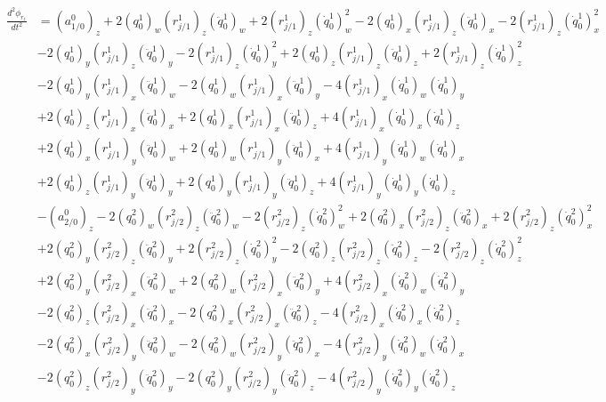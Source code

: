 \documentclass{article}
\begin{document}
\begin{align}
    \begin{split}
        \frac{d^2\phi_{r_z}}{dt^2} &= (a_{1/0}^0)_z + 2(q_0^1)_w(r_{j/1}^1)_z(\ddot{q}_0^1)_w + 2(r_{j/1}^1)_z(\dot{q}_0^1)_w^2 - 2(q_0^1)_x(r_{j/1}^1)_z(\ddot{q}_0^1)_x - 2(r_{j/1}^1)_z(\dot{q}_0^1)_x^2 \\
                                   &- 2(q_0^1)_y(r_{j/1}^1)_z(\ddot{q}_0^1)_y - 2(r_{j/1}^1)_z(\dot{q}_0^1)_y^2 + 2(q_0^1)_z(r_{j/1}^1)_z(\ddot{q}_0^1)_z + 2(r_{j/1}^1)_z(\dot{q}_0^1)_z^2 \\
                                   &- 2(q_0^1)_y(r_{j/1}^1)_x(\ddot{q}_0^1)_w - 2(q_0^1)_w(r_{j/1}^1)_x(\ddot{q}_0^1)_y - 4(r_{j/1}^1)_x(\dot{q}_0^1)_w(\dot{q}_0^1)_y \\
                                   &+ 2(q_0^1)_z(r_{j/1}^1)_x(\ddot{q}_0^1)_x + 2(q_0^1)_x(r_{j/1}^1)_x(\ddot{q}_0^1)_z + 4(r_{j/1}^1)_x(\dot{q}_0^1)_x(\dot{q}_0^1)_z \\
                                   &+ 2(q_0^1)_x(r_{j/1}^1)_y(\ddot{q}_0^1)_w + 2(q_0^1)_w(r_{j/1}^1)_y(\ddot{q}_0^1)_x + 4(r_{j/1}^1)_y(\dot{q}_0^1)_w(\dot{q}_0^1)_x \\
                                   &+ 2(q_0^1)_z(r_{j/1}^1)_y(\ddot{q}_0^1)_y + 2(q_0^1)_y(r_{j/1}^1)_y(\ddot{q}_0^1)_z + 4(r_{j/1}^1)_y(\dot{q}_0^1)_y(\dot{q}_0^1)_z \\
                                   &- (a_{2/0}^0)_z - 2(q_0^2)_w(r_{j/2}^2)_z(\ddot{q}_0^2)_w - 2(r_{j/2}^2)_z(\dot{q}_0^2)_w^2 + 2(q_0^2)_x(r_{j/2}^2)_z(\ddot{q}_0^2)_x + 2(r_{j/2}^2)_z(\dot{q}_0^2)_x^2 \\
                                   &+ 2(q_0^2)_y(r_{j/2}^2)_z(\ddot{q}_0^2)_y + 2(r_{j/2}^2)_z(\dot{q}_0^2)_y^2 - 2(q_0^2)_z(r_{j/2}^2)_z(\ddot{q}_0^2)_z - 2(r_{j/2}^2)_z(\dot{q}_0^2)_z^2 \\
                                   &+ 2(q_0^2)_y(r_{j/2}^2)_x(\ddot{q}_0^2)_w + 2(q_0^2)_w(r_{j/2}^2)_x(\ddot{q}_0^2)_y + 4(r_{j/2}^2)_x(\dot{q}_0^2)_w(\dot{q}_0^2)_y \\
                                   &- 2(q_0^2)_z(r_{j/2}^2)_x(\ddot{q}_0^2)_x - 2(q_0^2)_x(r_{j/2}^2)_x(\ddot{q}_0^2)_z - 4(r_{j/2}^2)_x(\dot{q}_0^2)_x(\dot{q}_0^2)_z \\
                                   &- 2(q_0^2)_x(r_{j/2}^2)_y(\ddot{q}_0^2)_w - 2(q_0^2)_w(r_{j/2}^2)_y(\ddot{q}_0^2)_x - 4(r_{j/2}^2)_y(\dot{q}_0^2)_w(\dot{q}_0^2)_x \\
                                   &- 2(q_0^2)_z(r_{j/2}^2)_y(\ddot{q}_0^2)_y - 2(q_0^2)_y(r_{j/2}^2)_y(\ddot{q}_0^2)_z - 4(r_{j/2}^2)_y(\dot{q}_0^2)_y(\dot{q}_0^2)_z
    \end{split}
\end{align}
\end{document}

